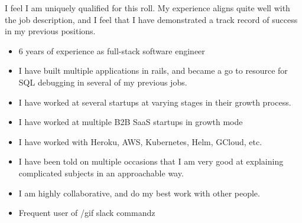 %
%
%


\par{
	I feel I am uniquely qualified for this roll. My experience aligns quite well with the job description, and I feel that I have demonstrated a track record of success  in my previous positions.
}
\begin{itemize}
	\item 6 years of experience as full-stack software engineer
	\item I have built multiple applications in rails, and became a go to resource for SQL debugging in several of my previous jobs.
	\item I have worked at several startups at varying stages in their growth process.
	\item I have worked at multiple B2B SaaS startups in growth mode
	\item I have worked with Heroku, AWS, Kubernetes, Helm,  GCloud, etc.
	\item I  have been told on  multiple occasions that I am very good at explaining complicated subjects in an approachable way.
	\item I am highly collaborative, and do my best work with other people. 
	\item Frequent user of /gif slack commandz
  \end{itemize}